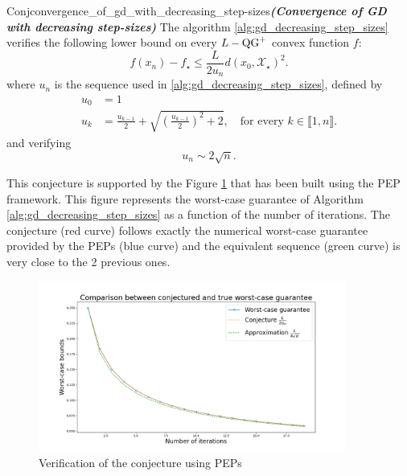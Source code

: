 \begin{restatable}{Conj}{convergence_of_gd_with_decreasing_step-sizes}\textbf{\emph{(Convergence of GD with decreasing step-sizes)}}
    \label{conj:gd_sqrt}
    The algorithm \ref{alg:gd_decreasing_step_sizes} verifies the following lower bound on every $L-\operatorname{QG}^+$ convex function $f$:
    \begin{equation}
        f(x_n) - f_\star \leq \frac{L}{2 u_n} d(x_0, \mathcal{X}_\star)^2.
    \end{equation}
    where $u_n$ is the sequence used in \ref{alg:gd_decreasing_step_sizes}, defined by
    \begin{align}
        u_0 & = 1 \\
        u_{k} & = \frac{u_{k-1}}{2} + \sqrt{\left(\frac{u_{k-1}}{2}\right)^2 + 2}, \quad \text{for every } k \in \llbracket 1, n \rrbracket.
    \end{align}
    and verifying
    \begin{equation}
        u_n \sim 2\sqrt{n}.
    \end{equation}
\end{restatable}

This conjecture is supported by the Figure \ref{fig:gd_sqrt} that has been built using the PEP framework.
This figure represents the worst-case guarantee of Algorithm \ref{alg:gd_decreasing_step_sizes} as a function of the number of iterations.
The conjecture (red curve) follows exactly the numerical worst-case guarantee provided by the PEPs (blue curve) and the equivalent sequence (green curve) is very close to the 2 previous ones.

\begin{figure}[h!]
    \centering
    \includegraphics[width=0.9\textwidth]{Figure_1.png}
    \caption{Verification of the conjecture using PEPs}
    \label{fig:gd_sqrt}
\end{figure}


